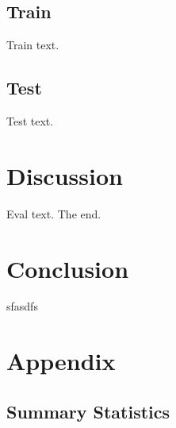 \documentclass[]{report}
\begin{document}
\hypertarget{train}{%
\section{Train}\label{train}}

Train text.

\hypertarget{test}{%
\section{Test}\label{test}}

Test text.

\hypertarget{discussion}{%
\chapter{Discussion}\label{discussion}}

Eval text. The end.

\hypertarget{conclusion}{%
\chapter{Conclusion}\label{conclusion}}

sfasdfs

\hypertarget{Appendix}{%
\chapter*{Appendix}\label{Appendix}}

\hypertarget{summary-statistics}{%
\section{Summary Statistics}\label{summary-statistics}}
\end{document}
